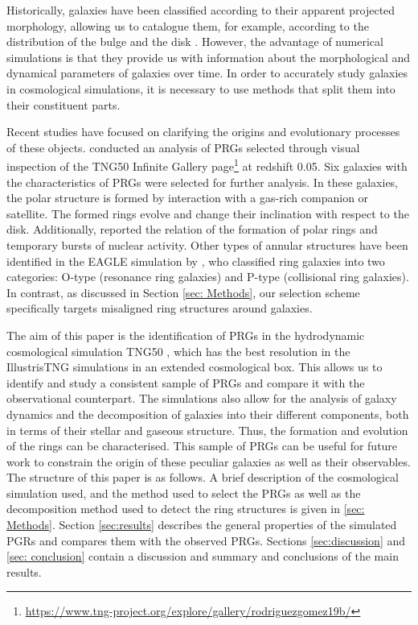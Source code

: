 \documentclass[fleqn,usenatbib]{mnras}
\begin{document}
Historically, galaxies have been classified according to their apparent projected morphology, allowing us to catalogue them, for example, according to the distribution of the bulge and the disk \citep{1926_Hubble,1968_Sersic}. However, the advantage of numerical simulations is that they provide us with information about the morphological and dynamical parameters of galaxies over time. In order to accurately study galaxies in cosmological simulations, it is necessary to use methods that split them into their constituent parts. 

Recent studies have focused on clarifying the origins and evolutionary processes of these objects. \citet{2023_Smirnov} conducted an analysis of PRGs selected through visual inspection of the TNG50 Infinite Gallery page\footnote{\url{https://www.tng-project.org/explore/gallery/rodriguezgomez19b/}} at redshift 0.05. Six galaxies with the characteristics of PRGs were selected for further analysis. In these galaxies, the polar structure is formed by interaction with a gas-rich companion or satellite. The formed rings evolve and change their inclination with respect to the disk. Additionally, \citet{2023_Smirnov} reported the relation of the formation of polar rings and temporary bursts of nuclear activity. Other types of annular structures have been identified in the EAGLE simulation by \citet{2018_Elegali}, who classified ring galaxies into two categories: O-type (resonance ring galaxies) and P-type (collisional ring galaxies). In contrast, as discussed in Section \ref{sec: Methods}, our selection scheme specifically targets misaligned ring structures around galaxies.

The aim of this paper is the identification of PRGs in the hydrodynamic cosmological simulation TNG50 \citep{Pillepich_2019, Nelson_2019}, which has the best resolution in the IllustrisTNG simulations in an extended cosmological box. This allows us to identify and study a consistent sample of PRGs and compare it with the observational counterpart. The simulations also allow for the analysis of galaxy dynamics and the decomposition of galaxies into their different components, both in terms of their stellar and gaseous structure. Thus, the formation and evolution of the rings can be characterised. This sample of PRGs can be useful for future work to constrain the origin of these peculiar galaxies as well as their observables. The structure of this paper is as follows. A brief description of the cosmological simulation used, and the method used to select the PRGs as well as the decomposition method used to detect the ring structures is given in \ref{sec: Methods}. Section \ref{sec:results} describes the general properties of the simulated PGRs and compares them with the observed PRGs. Sections \ref{sec:discussion} and \ref{sec: conclusion} contain a discussion and summary and conclusions of the main results. 
\end{document}

